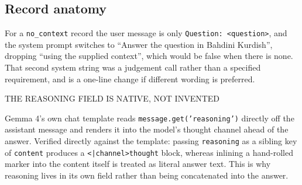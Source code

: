 \documentclass[10pt,a4paper]{article}
\newcommand{\codeid}[1]{\texttt{\footnotesize\color{inksoft}#1}}
\begin{document}
\subsection{Record anatomy}

\begin{figure}[h]
\centering
{}
\end{figure}

\vspace{-2mm}
For a \codeid{no\_context} record the user message is only
\codeid{Question: <question>}, and the system prompt switches to ``Answer the
question in Bahdini Kurdish'', dropping ``using the supplied context'',
which would be false when there is none. That second system string was a
judgement call rather than a specified requirement, and is a one-line change if
different wording is preferred.

\begin{warmcard}
{\uimed\fontsize{8.5}{11}\selectfont\color{crail}THE REASONING FIELD IS NATIVE, NOT INVENTED}\par\vspace{0.3em}
Gemma 4's own chat template reads \codeid{message.get('reasoning')} directly off
the assistant message and renders it into the model's thought channel ahead of
the answer. Verified directly against the template: passing
\codeid{reasoning} as a sibling key of \codeid{content} produces a
\codeid{<|channel>thought} block, whereas inlining a hand-rolled marker into
the content itself is treated as literal answer text. This is why reasoning
lives in its own field rather than being concatenated into the answer.
\end{warmcard}
\end{document}
